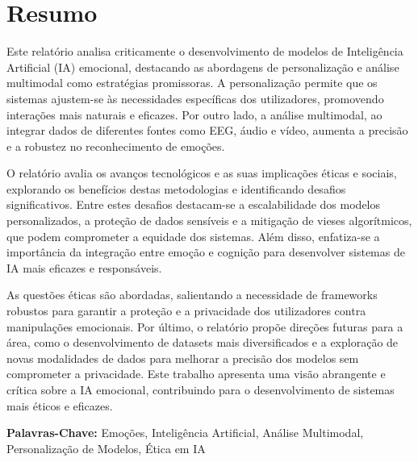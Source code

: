 \documentclass[a4paper,12pt]{report}
\begin{document}
	
	\newpage
	\thispagestyle{empty}
	\mbox{}
	\newpage
	
	
	\section*{Resumo}
	
	Este relatório analisa criticamente o desenvolvimento de modelos de Inteligência Artificial (IA) emocional, destacando as abordagens de personalização e análise multimodal como estratégias promissoras. A personalização permite que os sistemas ajustem-se às necessidades específicas dos utilizadores, promovendo interações mais naturais e eficazes. Por outro lado, a análise multimodal, ao integrar dados de diferentes fontes como EEG, áudio e vídeo, aumenta a precisão e a robustez no reconhecimento de emoções.
	
	O relatório avalia os avanços tecnológicos e as suas implicações éticas e sociais, explorando os benefícios destas metodologias e identificando desafios significativos. Entre estes desafios destacam-se a escalabilidade dos modelos personalizados, a proteção de dados sensíveis e a mitigação de vieses algorítmicos, que podem comprometer a equidade dos sistemas. Além disso, enfatiza-se a importância da integração entre emoção e cognição para desenvolver sistemas de IA mais eficazes e responsáveis.
	
	As questões éticas são abordadas, salientando a necessidade de frameworks robustos para garantir a  proteção e a privacidade dos utilizadores contra manipulações emocionais. Por último, o relatório propõe direções futuras para a área, como o desenvolvimento de datasets mais diversificados e a exploração de novas modalidades de dados para melhorar a precisão dos modelos sem comprometer a privacidade. Este trabalho apresenta uma visão abrangente e crítica sobre a IA emocional, contribuindo para o desenvolvimento de sistemas mais éticos e eficazes.

	\vspace{4em}
	
	\noindent\textbf{Palavras-Chave:} \normalsize{Emoções, Inteligência Artificial, Análise Multimodal, Personalização de Modelos, Ética em IA}
	
	\newpage

	
	
\end{document}
